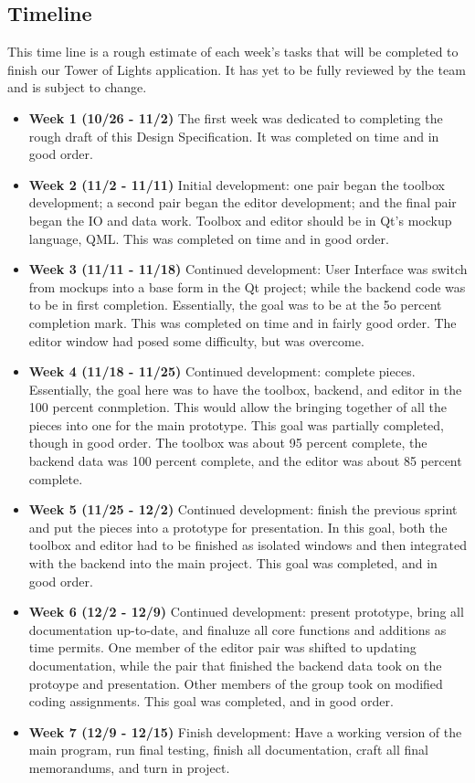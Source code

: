 \documentclass{article}
\begin{document}
\subsection{Timeline}
This time line is a rough estimate of each week's tasks that will be completed to finish our Tower of Lights application. It has yet to be fully reviewed by the team and is subject to change.
	\begin{itemize}
		\item \textbf{Week 1 (10/26 - 11/2)} The first week was dedicated to completing the rough draft of this Design Specification. It was completed on time and in good order.
		\item \textbf{Week 2 (11/2 - 11/11)} Initial development: one pair began the toolbox development; a second pair began the editor development; and the final pair began the IO and data work.  Toolbox and editor should be in Qt's mockup language, QML.  This was completed on time and in good order.
		\item \textbf{Week 3 (11/11 - 11/18)} Continued development: User Interface was switch from mockups into a base form in the Qt project; while the backend code was to be in first completion.  Essentially, the goal was to be at the 5o percent completion mark.  This was completed on time and in fairly good order.  The editor window had posed some difficulty, but was overcome.
		\item \textbf{Week 4 (11/18 - 11/25)} Continued development: complete pieces.  Essentially, the goal here was to have the toolbox, backend, and editor in the 100 percent conmpletion.  This would allow the bringing together of all the pieces into one for the main prototype.  This goal was partially completed, though in good order.  The toolbox was about 95 percent complete, the backend data was 100 percent complete, and the editor was about 85 percent complete.  
		\item \textbf{Week 5 (11/25 - 12/2)} Continued development: finish the previous sprint and put the pieces into a prototype for presentation.  In this goal, both the toolbox and editor had to be finished as isolated windows and then integrated with the backend into the main project.  This goal was completed, and in good order.  
		\item \textbf{Week 6 (12/2 - 12/9)} Continued development: present prototype, bring all documentation up-to-date, and finaluze all core functions and additions as time permits.  One member of the editor pair was shifted to updating documentation, while the pair that finished the backend data took on the protoype and presentation.  Other members of the group took on modified coding assignments.  This goal was completed, and in good order.
		\item \textbf{Week 7 (12/9 - 12/15)} Finish development: Have a working version of the main program, run final testing, finish all documentation, craft all final memorandums, and turn in project.
	\end{itemize}
\end{document}
